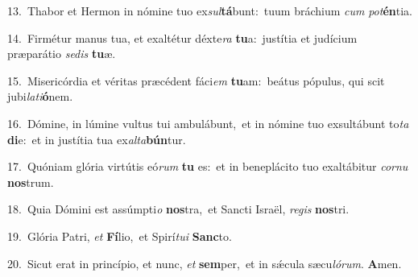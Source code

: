 {\numbfont\textcolor{\numbcolor}{13.}}~Thabor et Hermon in nómine tuo ex\-\textit{sul}\-\textbf{tá}bunt:~\star tuum bráchium \textit{cum} \textit{pot}\-\textbf{én}tia.\par
{\numbfont\textcolor{\numbcolor}{14.}}~Firmétur manus tua, et exaltétur déxte\textit{ra} \textbf{tu}\-a:~\star justítia et judícium præparátio \textit{se}\-\textit{dis} \textbf{tu}\-æ.\par
{\numbfont\textcolor{\numbcolor}{15.}}~Misericórdia et véritas præcédent fáci\textit{em} \textbf{tu}\-am:~\star beátus pópulus, qui scit jubi\-\textit{la}\-\textit{ti}\textbf{ó}nem.\par
{\numbfont\textcolor{\numbcolor}{16.}}~Dómine, in lúmine vultus tui ambulábunt,~\dagger et in nómine tuo exsultábunt to\textit{ta} \textbf{di}\-e:~\star et in justítia tua ex\-\textit{al}\-\textit{ta}\textbf{bún}tur.\par
{\numbfont\textcolor{\numbcolor}{17.}}~Quóniam glória virtútis eó\textit{rum} \textbf{tu} es:~\star et in beneplácito tuo exaltábitur \textit{cor}\-\textit{nu} \textbf{nos}\-trum.\par
{\numbfont\textcolor{\numbcolor}{18.}}~Quia Dómini est assúmpti\textit{o} \textbf{nos}\-tra,~\star et Sancti Israël, \textit{re}\-\textit{gis} \textbf{nos}\-tri.\par
{\numbfont\textcolor{\numbcolor}{19.}}~Glória Patri, \textit{et} \textbf{Fí}\-lio,~\star et Spirí\-\textit{tu}\-\textit{i} \textbf{Sanc}\-to.\par
{\numbfont\textcolor{\numbcolor}{20.}}~Sicut erat in princípio, et nunc, \textit{et} \textbf{sem}\-per,~\star et in sǽcula sæcu\-\textit{ló}\-\textit{rum}. \textbf{A}\-men.\par
